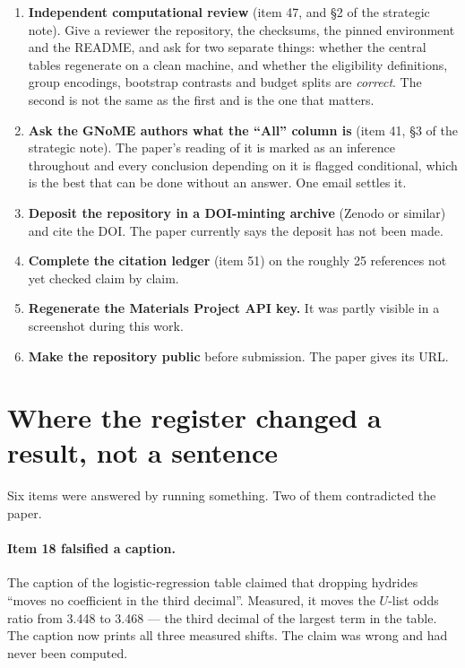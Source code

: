 \documentclass[11pt]{article}
\begin{document}
\begin{enumerate}
\item \textbf{Independent computational review} (item 47, and \S2 of the strategic note).
Give a reviewer the repository, the checksums, the pinned environment and the README, and
ask for two separate things: whether the central tables regenerate on a clean machine, and
whether the eligibility definitions, group encodings, bootstrap contrasts and budget splits
are \emph{correct}. The second is not the same as the first and is the one that matters.
\item \textbf{Ask the GNoME authors what the ``All'' column is} (item 41, \S3 of the
strategic note). The paper's reading of it is marked as an inference throughout and every
conclusion depending on it is flagged conditional, which is the best that can be done
without an answer. One email settles it.
\item \textbf{Deposit the repository in a DOI-minting archive} (Zenodo or similar) and cite
the DOI. The paper currently says the deposit has not been made.
\item \textbf{Complete the citation ledger} (item 51) on the roughly 25 references not yet
checked claim by claim.
\item \textbf{Regenerate the Materials Project API key.} It was partly visible in a
screenshot during this work.
\item \textbf{Make the repository public} before submission. The paper gives its URL.
\end{enumerate}

\section{Where the register changed a result, not a sentence}\label{sec:measured}

Six items were answered by running something. Two of them contradicted the paper.

\paragraph{Item 18 falsified a caption.} The caption of the logistic-regression table
claimed that dropping hydrides ``moves no coefficient in the third decimal''. Measured, it
moves the $U$-list odds ratio from 3.448 to 3.468 --- the third decimal of the largest term
in the table. The caption now prints all three measured shifts. The claim was wrong and had
never been computed.
\end{document}
